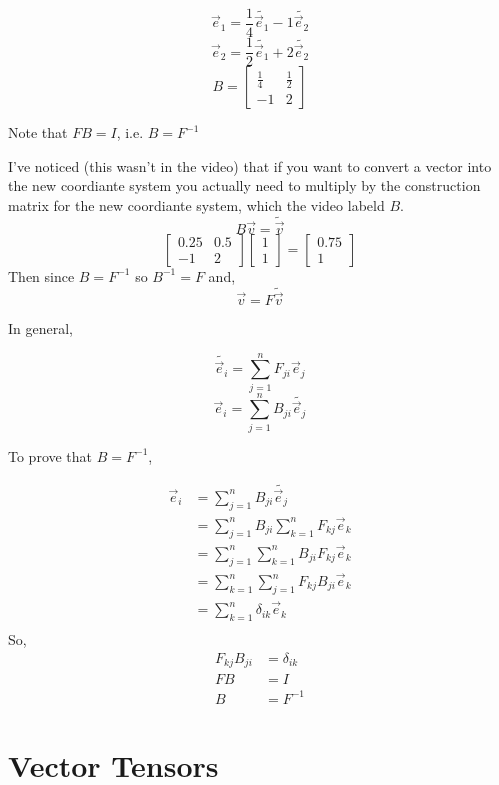 \documentclass[12pt]{book}
\theoremstyle{plain}
\theoremstyle{definition}
\theoremstyle{ppart}
\theoremstyle{case}
\theoremstyle{solution}
\begin{document}
\[ \vec{e}_1 = \frac{1}{4} \widetilde{\vec{e}_1} - 1 \widetilde{\vec{e}_2} \]
\[ \vec{e}_2 = \frac{1}{2} \widetilde{\vec{e}_1} + 2 \widetilde{\vec{e}_2} \]
\[
  B =
  \begin{bmatrix}
  \frac{1}{4} & \frac{1}{2} \\
  -1 & 2 
  \end{bmatrix}
\]

Note that $FB = I$, i.e. $B = F^{-1}$

I've noticed (this wasn't in the video) that if you want to convert a vector into the new coordiante system you actually
need to multiply by the construction matrix for the new coordiante system, which the video labeld $B$.
\[ B \vec{v} = \widetilde{\vec{v}} \]
\[
  \begin{bmatrix}
  0.25 & 0.5 \\
  -1 & 2 
  \end{bmatrix}
  \begin{bmatrix}
  1 \\
  1
  \end{bmatrix}
  =
  \begin{bmatrix}
  0.75 \\
  1
  \end{bmatrix}
\]
Then since $B = F^{-1}$ so $B^{-1} = F$ and,
\[ \vec{v} = F \widetilde{\vec{v}} \]

In general,

\label{vector_basis_transform}
\[ \widetilde{\vec{e}_i} = \sum_{j=1}^{n} F_{ji} \vec{e}_j \]
\[ \vec{e}_i = \sum_{j=1}^{n} B_{ji} \widetilde{\vec{e}_j} \]

To prove that $B = F^{-1}$,

\begin{align*}
  \vec{e}_i &= \sum_{j=1}^{n} B_{ji} \widetilde{\vec{e}_j} \\
  &= \sum_{j=1}^{n} B_{ji} \sum_{k=1}^{n} F_{kj} \vec{e}_k \\
  &= \sum_{j=1}^{n} \sum_{k=1}^{n} B_{ji} F_{kj} \vec{e}_k \\
  &= \sum_{k=1}^{n} \sum_{j=1}^{n} F_{kj} B_{ji} \vec{e}_k \\
  &= \sum_{k=1}^{n} \delta_{ik} \vec{e}_k \\
\end{align*}
So,
\begin{align*}
F_{kj} B_{ji} &= \delta_{ik} \\
FB &= I \\
B &= F^{-1}
\end{align*}

\chapter{Vector Tensors}
\end{document}
